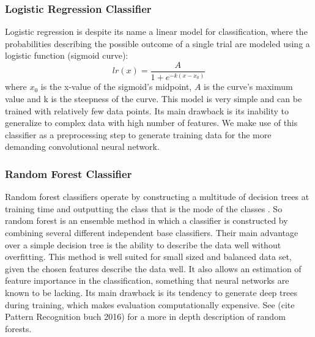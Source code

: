 		\subsubsection{Logistic Regression Classifier}
			Logistic regression is despite its name a linear model for classification, where the probabilities describing the possible outcome of a single trial are modeled using a logistic function (sigmoid curve):
			\begin{equation}
				lr(x) = \dfrac{A}{1 + e^{-k (x-x_0)}}
			\end{equation}
		where $x_0$ is the x-value of the sigmoid's midpoint, $A$ is the curve's maximum value and k is the steepness of the curve. This model is very simple and can be trained with relatively few data points. Its main drawback is its inability to generalize to complex data with high number of features. We make use of this classifier as a preprocessing step to generate training data for the more demanding convolutional neural network. 
		
		\subsubsection{Random Forest Classifier}\label{rand_forest_class}
			Random forest classifiers operate by constructing a multitude of decision trees at training time and outputting the class that is the mode of the classes \citep{Ho1995}. So random forest is an ensemble method in which a classifier is constructed by combining several different independent base classifiers. Their main advantage over a simple decision tree is the ability to describe the data well without overfitting. 			
			This method is well suited for small sized and balanced data set, given the chosen features describe the data well. It also allows an estimation of feature importance in the classification, something that neural networks are known to be lacking. Its main drawback is its tendency to generate deep trees during training, which makes evaluation computationally expensive. See (cite Pattern Recognition buch 2016) for a more in depth description of random forests. %
			
